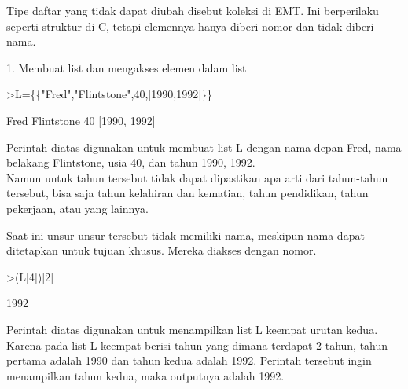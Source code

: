 \documentclass[a4paper,10pt]{article}
\begin{document}
\begin{eulernotebook}
\begin{eulercomment}
\begin{eulercomment}
\begin{eulercomment}
\begin{eulercomment}
\begin{eulercomment}
\begin{eulercomment}
\begin{eulercomment}
\begin{eulercomment}
\begin{eulercomment}
\begin{eulercomment}
\begin{eulercomment}
\begin{eulercomment}
\begin{eulercomment}
\begin{eulercomment}
\begin{eulercomment}
Tipe daftar yang tidak dapat diubah disebut koleksi di EMT. Ini
berperilaku seperti struktur di C, tetapi elemennya hanya diberi nomor
dan tidak diberi nama.

1. Membuat list dan mengakses elemen dalam list
\end{eulercomment}
\begin{eulerprompt}
>L=\{\{"Fred","Flintstone",40,[1990,1992]\}\}
\end{eulerprompt}
\begin{euleroutput}
  Fred
  Flintstone
  40
  [1990,  1992]
\end{euleroutput}
\begin{eulercomment}
Perintah diatas digunakan untuk membuat list L dengan nama depan Fred,
nama belakang Flintstone, usia 40, dan tahun 1990, 1992.\\
Namun untuk tahun tersebut tidak dapat dipastikan apa arti dari
tahun-tahun tersebut, bisa saja tahun kelahiran dan kematian, tahun
pendidikan, tahun pekerjaan, atau yang lainnya.

Saat ini unsur-unsur tersebut tidak memiliki nama, meskipun nama dapat
ditetapkan untuk tujuan khusus. Mereka diakses dengan nomor.
\end{eulercomment}
\begin{eulerprompt}
>(L[4])[2]
\end{eulerprompt}
\begin{euleroutput}
  1992
\end{euleroutput}
\begin{eulercomment}
Perintah diatas digunakan untuk menampilkan list L keempat urutan
kedua. Karena pada list L keempat berisi tahun yang dimana terdapat 2
tahun, tahun pertama adalah 1990 dan tahun kedua adalah 1992. Perintah
tersebut ingin menampilkan tahun kedua, maka outputnya adalah 1992.


\end{eulercomment}
\end{eulercomment}
\end{eulercomment}
\end{eulercomment}
\end{eulercomment}
\end{eulercomment}
\end{eulercomment}
\end{eulercomment}
\end{eulercomment}
\end{eulercomment}
\end{eulercomment}
\end{eulercomment}
\end{eulercomment}
\end{eulercomment}
\end{eulercomment}
\end{eulernotebook}
\end{document}
